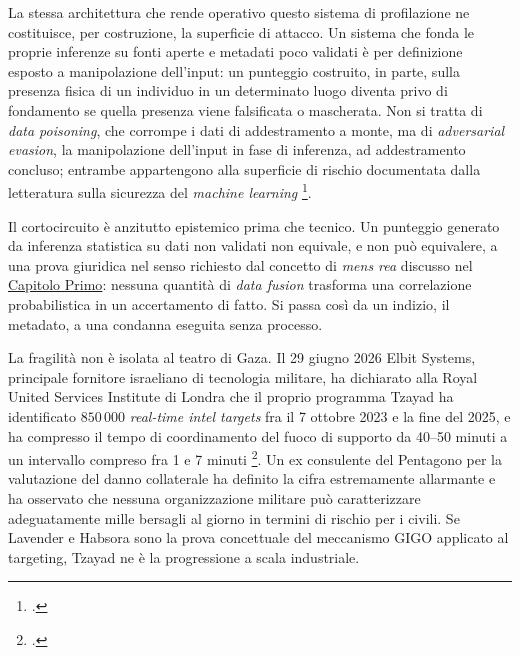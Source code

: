 \ifstampa\documentclass[a4paper,12pt,twoside,openright]{report}\else\documentclass[a4paper,12pt]{report}\fi
\newif\ifrevisione \revisionefalse
\DeclareRobustCommand{\rev}[1]{\ifrevisione{\color{blue!65!black}#1}\else#1\fi}
\begin{document}
La stessa architettura che rende operativo questo sistema di profilazione ne
costituisce, per costruzione, la superficie di attacco. Un sistema che fonda le
proprie inferenze su fonti aperte e metadati poco validati è per definizione
esposto a manipolazione dell'input: un punteggio costruito, in parte, sulla
presenza fisica di un individuo in un determinato luogo diventa privo di
fondamento se quella presenza viene falsificata o mascherata. Non si tratta di
\textit{data poisoning}, che corrompe i dati di addestramento a monte, ma di
\textit{adversarial evasion}, la manipolazione dell'input \rev{in fase di
inferenza, ad addestramento concluso}; entrambe appartengono alla superficie di rischio documentata dalla
letteratura sulla sicurezza del \textit{machine learning}
\footcite{cina_2023_poisoning}.

Il cortocircuito è anzitutto epistemico prima che tecnico. Un punteggio generato
da inferenza statistica su dati non validati non equivale, e non può equivalere,
a una prova giuridica nel senso richiesto dal concetto di \textit{mens rea}
discusso nel \hyperref[cap1]{Capitolo Primo}: nessuna quantità di \textit{data fusion}
trasforma una correlazione probabilistica in un accertamento di fatto. Si passa
così da un indizio, il metadato, a una condanna eseguita senza processo.

La fragilità non è isolata al teatro di Gaza. Il 29 giugno 2026 Elbit Systems,
principale fornitore israeliano di tecnologia militare, ha dichiarato alla Royal
United Services Institute di Londra che il proprio programma Tzayad ha
identificato $850\,000$ \textit{real-time intel targets} fra il 7 ottobre 2023 e
la fine del 2025, e ha compresso il tempo di coordinamento del fuoco di supporto
da 40--50 minuti a un intervallo compreso fra 1 e 7 minuti
\footcite{guardian_2026_tzayad}. Un ex consulente del Pentagono per la valutazione
del danno collaterale ha definito la cifra estremamente allarmante e ha osservato
che nessuna organizzazione militare può caratterizzare adeguatamente mille
bersagli al giorno in termini di rischio per i civili. Se Lavender e Habsora sono
la prova concettuale del meccanismo GIGO applicato al targeting, Tzayad ne è la
progressione a scala industriale.
\end{document}
